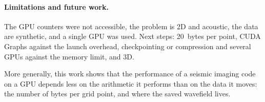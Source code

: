 \documentclass[letterpaper,11pt,leqno]{article}
\newcommand{\bib}{paper.bib}
\begin{document}
\paragraph{Limitations and future work.} The GPU counters were not accessible, the problem is 2D and acoustic, the data are synthetic, and a single GPU was used. Next steps: 20~bytes per point, CUDA Graphs against the launch overhead, checkpointing or compression and several GPUs against the memory limit, and 3D.

More generally, this work shows that the performance of a seismic imaging code on a GPU depends less on the arithmetic it performs than on the data it moves: the number of bytes per grid point, and where the saved wavefield lives.


\end{document}
